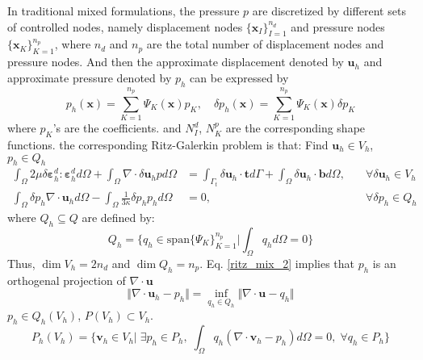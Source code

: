 In traditional mixed formulations, the pressure $p$ are discretized by different sets of controlled nodes, namely displacement nodes $\{\boldsymbol x_I\}_{I=1}^{n_d}$ and pressure nodes $\{\boldsymbol x_K\}_{K=1}^{n_p}$, where $n_d$ and $n_p$ are the total number of displacement nodes and pressure nodes. And then the approximate displacement denoted by $\boldsymbol u_h$ and approximate pressure denoted by $p_h$ can be expressed by  
\begin{equation}\label{p_h}
    p_h(\boldsymbol x) = \sum_{K=1}^{n_p} \Psi_K(\boldsymbol x) p_K, \quad
    \delta p_h(\boldsymbol x) = \sum_{K=1}^{n_p} \Psi_K(\boldsymbol x) \delta p_K
\end{equation}
where $p_K$'s are the coefficients. and $N_I^d$, $N_K^p$ are the corresponding shape functions.
the corresponding Ritz-Galerkin problem is that:
Find $\boldsymbol u_h \in V_h$, $p_h \in Q_h$
\begin{subequations}\label{ritz_mix}
\begin{alignat}{2}
\label{ritz_mix_1}
\int_\Omega 2\mu \delta \boldsymbol \varepsilon^d_h : \boldsymbol \varepsilon^d_h d\Omega +
\int_\Omega \nabla \cdot \delta \boldsymbol u_h p d\Omega &=
\int_{\Gamma_t} \delta \boldsymbol u_h \cdot \boldsymbol t d\Gamma + \int_\Omega \delta \boldsymbol u_h \cdot \boldsymbol b d\Omega,  \quad
&\forall \delta \boldsymbol u_h \in V_h \\
\label{ritz_mix_2}
\int_\Omega \delta p_h \nabla \cdot \boldsymbol u_h d\Omega - \int_\Omega \frac{1}{3\kappa} \delta p_h p_h d\Omega &= 0, &\forall \delta p_h \in Q_h
\end{alignat}
\end{subequations}
where $Q_h \subseteq Q$ are defined by:
\begin{equation}
Q_h = \{q_h \in \mathrm{span}\{\Psi_K\}_{K=1}^{n_p} \vert \int_{\Omega} q_h d\Omega = 0\}
\end{equation}
Thus, $\dim V_h = 2n_d$ and $\dim Q_h = n_p$.
Eq. \eqref{ritz_mix_2} implies that $p_h$ is an orthogenal projection of $\nabla \cdot \boldsymbol u $
\begin{equation}
\Vert \nabla \cdot \boldsymbol u_h - p_h \Vert = \inf_{q_h \in Q_h} \Vert \nabla \cdot \boldsymbol u - q_h \Vert
\end{equation}
$p_h \in Q_h(V_h)$, $P(V_h) \subset V_h$.
\begin{equation}
    P_h(V_h) = \{\boldsymbol v_h \in V_h \vert \; \exists p_h \in P_h, \; \int_\Omega q_h(\nabla \cdot \boldsymbol v_h - p_h) d\Omega = 0, \; \forall q_h \in P_h \}
\end{equation}

